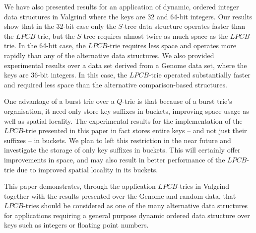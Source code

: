 \documentclass[]{acmtrans2m}
\begin{document}
We have also presented results for an application of dynamic, ordered integer data structures in Valgrind where the keys are 32 and 64-bit integers.
Our results show that in the 32-bit case only the $S$-tree data structure operates faster than the $LPCB$-trie, but the $S$-tree requires almost
twice as much space as the $LPCB$-trie. In the 64-bit case, the $LPCB$-trie requires less space and operates more rapidly
than any of the alternative data structures. We also provided experimental results over a data set derived from a Genome data set, where the
keys are 36-bit integers. In this case, the $LPCB$-trie operated substantially faster and required less space than the alternative comparison-based structures.

One advantage of a burst trie over a $Q$-trie is that because of a burst trie's organisation, it need only store key suffixes in buckets, improving space usage as
well as spatial locality. The experimental results for the implementation of the $LPCB$-trie presented in this paper in fact stores entire keys -- and not just their suffixes --
in buckets. We plan to left this restriction in the near future and investigate the storage of only key suffixes in buckets. This will certainly offer 
improvements in space, and may also result in better performance of the $LPCB$-trie due to improved spatial locality in its buckets.

This paper demonstrates, through the application $LPCB$-tries in Valgrind together with the results presented over the Genome and random data, 
that $LPCB$-tries should be considered as one of the many alternative data structures for applications requiring a general purpose dynamic ordered data structure 
over keys such as integers or floating point numbers.




\begin{received}
\end{received}
\end{document}
